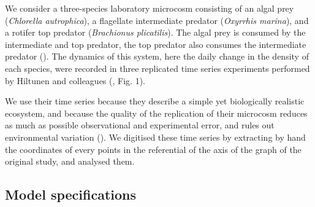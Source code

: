 \documentclass[11pt, oneside]{article}
\begin{document}
We consider a three-species laboratory microcosm consisting of an algal prey (\textit{Chlorella autrophica}), a flagellate intermediate predator (\textit{Oxyrrhis marina}), and a rotifer top predator (\textit{Brachionus plicatilis}).
The algal prey is consumed by the intermediate and top predator, the top predator also consumes the intermediate predator (\cite{Arndt1993}).
The dynamics of this system, here the daily change in the density of each species, were recorded in three replicated time series experiments performed by Hiltunen and colleagues (\cite{Hiltunen2013}, Fig. 1).

We use their time series because they describe a simple yet biologically realistic ecosystem, and because the quality of the replication of their microcosm reduces as much as possible observational and experimental error, and rules out environmental variation (\cite{Hiltunen2013}).
We digitised these time series by extracting by hand the coordinates of every points in the referential of the axis of the graph of the original study, and analysed them.

% 

\subsection{Model specifications}
\end{document}
